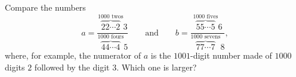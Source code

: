 Compare the numbers
\[
a=\dfrac{\overbrace{22\cdots2}^{1000\text{ twos}}3}{\overbrace{44\cdots4}^{1000\text{ fours}}5}
\qquad\text{and}\qquad
b=\dfrac{\overbrace{55\cdots5}^{1000\text{ fives}}6}{\overbrace{77\cdots7}^{1000\text{ sevens}}8},
\]
where, for example, the numerator of $a$ is the $1001$-digit number made of $1000$ digits $2$ followed by the digit $3$. Which one is larger?
